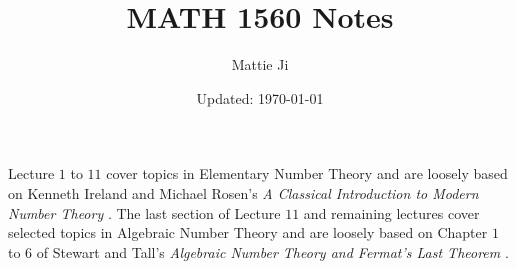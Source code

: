 \documentclass{article}
\title{MATH 1560 Notes}
\author{Mattie Ji}
\date{Updated: \today}
\begin{document}
\maketitle



\noindent Lecture $1$ to $11$ cover topics in Elementary Number Theory and are loosely based on Kenneth Ireland and Michael Rosen's \textit{A Classical Introduction to Modern Number Theory} \cite{ireland_rosen_2011}. The last section of Lecture $11$ and remaining lectures cover selected topics in Algebraic Number Theory and are loosely based on Chapter $1$ to $6$ of Stewart and Tall's \textit{Algebraic Number Theory and Fermat's Last Theorem} \cite{stewart_tall_2020}.

\tableofcontents


\newpage

























\newpage
{}


\end{document}
